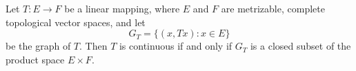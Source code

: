 Let $T: E \to F$ be a linear mapping, where $E$ and $F$ are metrizable, complete topological vector spaces, and let
$$
G_T = \{(x, Tx) : x \in E\}
$$
be the graph of $T$. Then $T$ is continuous if and only if $G_T$ is a closed subset of the product space $E \times F$.
